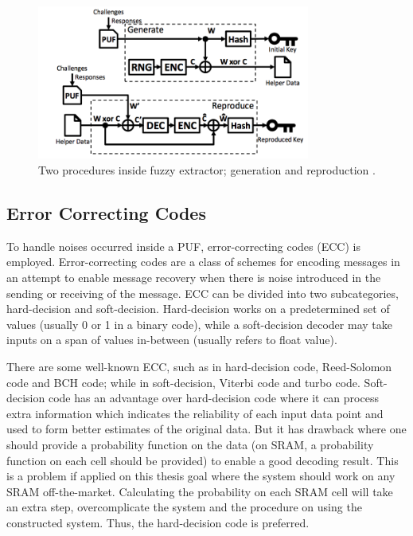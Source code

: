 \begin{figure}[tph!]
    \centerline{\includegraphics[width={0.8\textwidth}]{images/scheme_stable_key_generation}}
    \caption{Two procedures inside fuzzy extractor; generation and reproduction \cite{stable_key_generation}.}
    \label{fig:scheme-key-generator}
\end{figure}

\subsection{Error Correcting Codes}
To handle noises occurred inside a PUF, error-correcting codes (ECC) is employed.
Error-correcting codes are a class of schemes for encoding messages in an attempt to enable message recovery when there is noise introduced in the sending or receiving of the message. ECC can be divided into two subcategories, hard-decision and soft-decision. Hard-decision works on a predetermined set of values (usually 0 or 1 in a binary code), while a soft-decision decoder may take inputs on a span of values in-between (usually refers to float value).

There are some well-known ECC, such as in hard-decision code, Reed-Solomon code and BCH code; while in soft-decision, Viterbi code and turbo code. Soft-decision code has an advantage over hard-decision code where it can process extra information which indicates the reliability of each input data point and used to form better estimates of the original data. But it has drawback where one should provide a probability function on the data (on SRAM, a probability function on each cell should be provided) to enable a good decoding result. This is a problem if applied on this thesis goal where the system should work on any SRAM off-the-market. Calculating the probability on each SRAM cell will take an extra step, overcomplicate the system and the procedure on using the constructed system. Thus, the hard-decision code is preferred.

